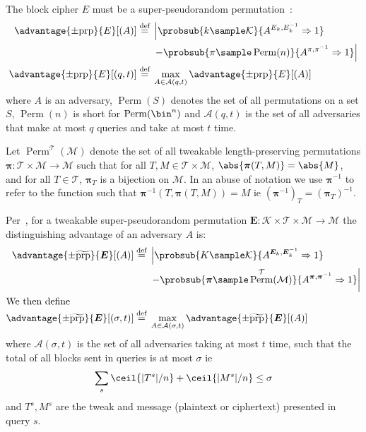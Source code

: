 \documentclass[letterpaper,11pt]{article}
\newcommand*{\defeq}{\stackrel{\text{def}}{=}}
\DeclareMathOperator{\Perm}{Perm}
\begin{document}
The block cipher
$E$
must be a super-pseudorandom permutation~\cite{concrete}:
%
\begin{align*}
    \advantage{\pm \mathrm{prp}}{E}[(A)] \defeq
    {}&\left\lvert\probsub{k \sample \mathcal{K}}{A^{E_k,E_k^{-1}}\Rightarrow 1}\right.
    \\
    {}&\left. - \probsub{\pi \sample \Perm(n)}{A^{\pi,\pi^{-1}}\Rightarrow 1}\right\rvert
    \\
    \advantage{\pm \mathrm{prp}}{E}[(q, t)] \defeq
    {}&\max_{A \in \mathcal{A}(q, t)} \advantage{\pm \mathrm{prp}}{E}[(A)]
\end{align*}
%
where $A$ is an adversary,
$\Perm(S)$ denotes the set of all permutations on a set $S$,
$\Perm(n)$ is short for $\Perm(\bin^n)$
and
$\mathcal{A}(q, t)$
is the set of all adversaries that make at most $q$ queries and take at most $t$ time.

Let $\Perm^\mathcal{T}(\mathcal{M})$
denote the set of all
tweakable length-preserving permutations
$\bm{\pi} : \mathcal{T} \times \mathcal{M} \rightarrow \mathcal{M}$
such that for all $T, M \in \mathcal{T} \times \mathcal{M}$,
$\abs{\bm{\pi}(T, M)} = \abs{M}$, and
for all $T \in \mathcal{T}$, $\bm{\pi}_{T}$ is a bijection on \(\mathcal{M}\).
In an abuse of notation
we use $\bm{\pi}^{-1}$ to refer to the function
such that $\bm{\pi}^{-1}(T, \bm{\pi}(T, M)) = M$ ie $(\bm{\pi}^{-1})_T = (\bm{\pi}_T)^{-1}$.

Per~\cite{cmc}, for a tweakable super-pseudorandom permutation
$\bm{E} : \mathcal{K} \times \mathcal{T} \times \mathcal{M} \rightarrow \mathcal{M}$
the distinguishing advantage of an adversary $A$ is:
%
\begin{align*}
    \advantage{\pm \widetilde{\mathrm{prp}}}{\bm{E}}[(A)] \defeq
    {}&\left\lvert\probsub{K \sample \mathcal{K}}{A^{\bm{E}_k,\bm{E}_k^{-1}}\Rightarrow 1}\right.
    \\
    {}&\left. - \probsub{\bm{\pi} \sample \Perm^\mathcal{T}(\mathcal{M})}
        {A^{\bm{\pi},\bm{\pi}^{-1}}\Rightarrow 1}\right\rvert
    \\
    \intertext{We then define}
    \advantage{\pm \widetilde{\mathrm{prp}}}{\bm{E}}[(\sigma, t)]
    \defeq {}&
    \max_{A \in \mathcal{A}(\sigma, t)} \advantage{\pm \widetilde{\mathrm{prp}}}{\bm{E}}[(A)]
\end{align*}
where \(\mathcal{A}(\sigma, t)\)
is the set of all adversaries taking at most \(t\) time,
such that the total of all blocks sent in queries is
at most \(\sigma\) ie
\begin{displaymath}
    \sum_s \ceil{|T^s|/n} + \ceil{|M^s|/n} \leq \sigma
\end{displaymath}
and \(T^s, M^s\) are the tweak and message
(plaintext or ciphertext)
presented in query \(s\).
\end{document}
